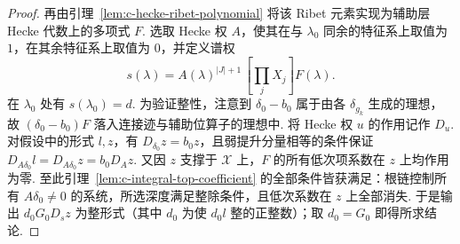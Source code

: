 \begin{proof}
再由引理~\ref{lem:c-hecke-ribet-polynomial} 将该 Ribet 元素实现为辅助层 Hecke 代数上的多项式 $F$. 选取 Hecke 权 $A$，使其在与 $\lambda_0$ 同余的特征系上取值为 $1$，在其余特征系上取值为 $0$，并定义谱权
\[
 s(\lambda)=A(\lambda)^{|J|+1}\,[\textstyle\prod_j X_j]F(\lambda).
\]
在 $\lambda_0$ 处有 $s(\lambda_0)=d$. 为验证整性，注意到 $\delta_0-b_0$ 属于由各 $\delta_{g_k}$ 生成的理想，故 $(\delta_0-b_0)F$ 落入连接迹与辅助位算子的理想中. 将 Hecke 权 $u$ 的作用记作 $D_u$. 对假设中的形式 $l,z$，有 $D_{\delta_0}z=b_0z$，且弱提升分量相等的条件保证 $D_{A\delta_0}l=D_{A\delta_0}z=b_0D_Az$. 又因 $z$ 支撑于 $\mathcal X$ 上，$F$ 的所有低次项系数在 $z$ 上均作用为零. 至此引理~\ref{lem:c-integral-top-coefficient} 的全部条件皆获满足：根链控制所有 $A\delta_0\ne0$ 的系统，所选深度满足整除条件，且低次系数在 $z$ 上全部消失. 于是输出 $d_0G_0 D_s z$ 为整形式（其中 $d_0$ 为使 $d_0l$ 整的正整数）；取 $d_0=G_0$ 即得所求结论.
\end{proof}

